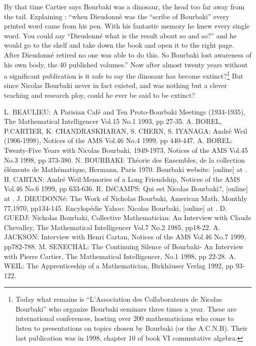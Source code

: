 \documentclass[12pt]{article}
\begin{document}
By that time Cartier says Bourbaki was a dinosaur, the head too far away 
from the tail. Explaining : ``when Dieudonn\'e was the ``scribe of Bourbaki'' 
every printed word came from his pen. With his fantastic memory he knew every 
single word. You could say ``Dieudonn\'e what is the result about so and so?'' 
and he would go to the shelf and take down the book and open it to the right 
page. After Dieudonn\'e retired no one was able to do this. So Bourbaki lost 
awareness of his own body, the 40 published volumes.''\cite{SM} Now after 
almost twenty years without a significant publication is it safe to say the 
dinosaur has become extinct?\footnote{Today what remains is  ``L'Association 
des Collaborateurs de Nicolas Bourbaki'' who organize Bourbaki seminars three 
times a year. These are international conferences, hosting over 200 
mathematicians who come to listen to presentations on topics chosen by 
Bourbaki (or the A.C.N.B). Their last publication was in 1998, chapter 
10 of book VI commutative algebra.} But since Nicolas Bourbaki never in 
fact existed, and was nothing but a clever teaching and research ploy, could 
he ever be said to be extinct?



\begin{thebibliography}{99}
 L. BEAULIEU: A Parisian Caf\'e and Ten Proto-Bourbaki Meetings (1934-1935), The Mathematical Intelligencer Vol.15 No.1 1993, pp 27-35.
 A. BOREL, P.CARTIER, K. CHANDRASKHARAN, S. CHERN, S. IYANAGA: Andr\'e Weil (1906-1998), Notices of the AMS Vol.46 No.4 1999, pp 440-447.
 A. BOREL: Twenty-Five Years with Nicolas Bourbaki, 1949-1973, Notices of the AMS Vol.45 No.3 1998, pp 373-380.
 N. BOURBAKI: Th\'eorie des Ensembles, de la collection \'el\'ements de Math\'ematique, Hermann, Paris 1970.
 Bourbaki website: [online] at .
 H. CARTAN: Andr\'e Weil:Memories of a Long Friendship, Notices of the AMS Vol.46 No.6 1999, pp 633-636.
 R. D\'eCAMPS: Qui est Nicolas Bourbaki?, [online] at .
 J. DIEUDONN\'e: The Work of Nicholas Bourbaki, American Math. Monthly 77,1970, pp134-145.
 Encylop\'edie Yahoo: Nicolas Bourbaki, [online] at  .
 D. GUEDJ: Nicholas Bourbaki, Collective Mathematician: An Interview with Claude Chevalley, The Mathematical Intelligencer Vol.7 No.2 1985, pp18-22.
 A. JACKSON: Interview with Henri Cartan, Notices of the AMS Vol.46 No.7 1999, pp782-788.
 M. SENECHAL: The Continuing Silence of Bourbaki- An Interview with Pierre Cartier, The Mathematical Intelligencer, No.1 1998, pp 22-28.
 A. WEIL: The Apprenticeship of a Mathematician, Birkh\"auser Verlag 1992, pp 93-122.
\end{thebibliography}
\end{document}
